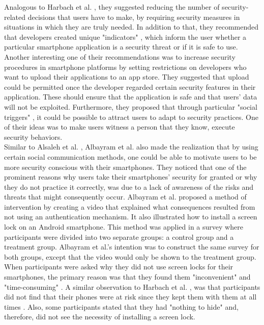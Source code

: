 Analogous to Harbach et al. \cite{harbach}, they suggested reducing the number of security-related decisions that users have to make, by requiring security measures in situations in which they are truly needed. In addition to that, they recommended that developers created unique "indicators" \cite{Alsaleh}, which inform the user whether a particular smartphone application is a security threat or if it is safe to use. Another interesting one of their recommendations was to increase security procedures in smartphone platforms by setting restrictions on developers who want to upload their applications to an app store. They suggested that upload could be permitted once the developer regarded certain security features in their application.  These should ensure that the application is safe and that users' data will not be exploited. Furthermore, they proposed that through particular "social triggers" \cite{Alsaleh}, it could be possible to attract users to adapt to security practices. One of their ideas was to make users witness a person that they know, execute security behaviors. \\

Similar to Alsaleh et al. \cite{Alsaleh}, Albayram et al. \cite{Albayram:2017:BUL:3235924.3235929} also made the realization that by using certain social communication methods, one could be able to motivate users to be more security conscious with their smartphones. They noticed that one of the prominent reasons why users take their smartphones' security for granted or why they do not practice it correctly, was due to a lack of awareness of the risks and threats that might consequently occur. Albayram et al. \cite{Albayram:2017:BUL:3235924.3235929} proposed a method of intervention by creating a video that explained what consequences resulted from not using an authentication mechanism. It also illustrated how to install a screen lock on an Android smartphone. This method was applied in a survey where participants were divided into two separate groups: a control group and a treatment group. Albayram et al.'s \cite{Albayram:2017:BUL:3235924.3235929} intention was to construct the same survey for both groups, except that the video would only be shown to the treatment group. When participants were asked why they did not use screen locks for their smartphones, the primary reason was that they found them "inconvenient" and "time-consuming" \cite{Albayram:2017:BUL:3235924.3235929}. A similar observation to Harbach et al. \cite{harbach}, was that participants did not find that their phones were at risk since they kept them with them at all times \cite{Albayram:2017:BUL:3235924.3235929}. Also, some participants stated that they had "nothing to hide" and, therefore, did not see the necessity of installing a screen lock.\\

